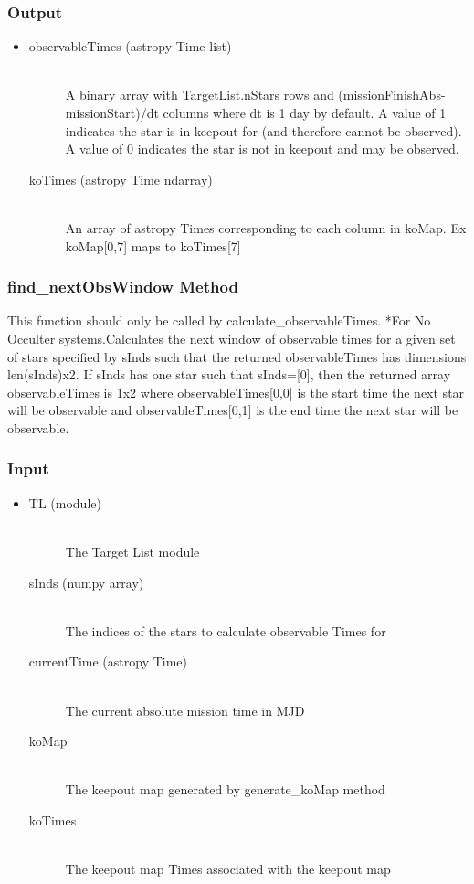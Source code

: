 \documentclass[cleanfoot]{asme2ej}
\begin{document}
\subsubsection*{Output}
\begin{itemize}
\item 
\begin{description}
    \item[observableTimes (astropy Time list)] \hfill \\ A binary array with TargetList.nStars rows and (missionFinishAbs-missionStart)/dt columns where dt is 1 day by default. A value of 1 indicates the star is in keepout for (and therefore cannot be observed). A value of 0 indicates the star is not in keepout and may be observed.
    \item[koTimes (astropy Time ndarray)] \hfill \\ An array of astropy Times corresponding to each column in koMap. Ex koMap[0,7] maps to koTimes[7] 
\end{description}
\end{itemize}

\subsubsection{find\_nextObsWindow Method}
This function should only be called by calculate\_observableTimes. *For No Occulter systems.Calculates the next window of observable times for a given set of stars specified by sInds such that the returned observableTimes has dimensions len(sInds)x2. If sInds has one star such that sInds=[0], then the returned array observableTimes is 1x2 where observableTimes[0,0] is the start time the next star will be observable and observableTimes[0,1] is the end time the next star will be observable.
\subsubsection*{Input}
\begin{itemize}
\item 
\begin{description}
    \item[TL (module)] \hfill \\ The Target List module
    \item[sInds (numpy array)] \hfill \\ The indices of the stars to calculate observable Times for
    \item[currentTime (astropy Time)] \hfill \\ The current absolute mission time in MJD
    \item[koMap] \hfill \\ The keepout map generated by generate\_koMap method
    \item[koTimes] \hfill \\ The keepout map Times associated with the keepout map
\end{description}
\end{itemize}
\end{document}
